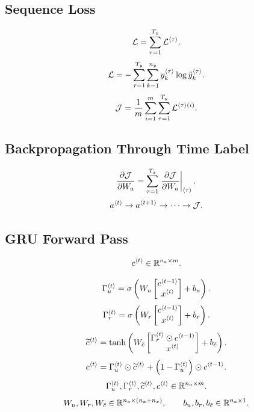\subsection{Sequence Loss}

\[
\mathcal{L}
=
\sum_{\tau=1}^{T_y}
\mathcal{L}^{\langle \tau\rangle}.
\]
\[
\mathcal{L}
=
-\sum_{\tau=1}^{T_y}
\sum_{k=1}^{n_y}
y_k^{\langle \tau\rangle}
\log
\hat{y}_k^{\langle \tau\rangle}.
\]
\[
\mathcal{J}
=
\frac{1}{m}
\sum_{i=1}^{m}
\sum_{\tau=1}^{T_y}
\mathcal{L}^{\langle \tau\rangle(i)}.
\]

\subsection{Backpropagation Through Time Label}

\[
\frac{\partial \mathcal{J}}{\partial W_a}
=
\sum_{\tau=1}^{T_x}
\left.
\frac{\partial \mathcal{J}}{\partial W_a}
\right|_{\langle \tau\rangle}.
\]
\[
a^{\langle t\rangle}
\to
a^{\langle t+1\rangle}
\to
\cdots
\to
\mathcal{J}.
\]

\subsection{GRU Forward Pass}

\[
c^{\langle t\rangle}
\in
\mathbb{R}^{n_a \times m}.
\]

\[
\Gamma_u^{\langle t\rangle}
=
\sigma
\left(
W_u
\begin{bmatrix}
c^{\langle t-1\rangle}\\
x^{\langle t\rangle}
\end{bmatrix}
+
b_u
\right).
\]
\[
\Gamma_r^{\langle t\rangle}
=
\sigma
\left(
W_r
\begin{bmatrix}
c^{\langle t-1\rangle}\\
x^{\langle t\rangle}
\end{bmatrix}
+
b_r
\right).
\]
\[
\widetilde{c}^{\langle t\rangle}
=
\tanh
\left(
W_{\tilde{c}}
\begin{bmatrix}
\Gamma_r^{\langle t\rangle}
\odot
c^{\langle t-1\rangle}\\
x^{\langle t\rangle}
\end{bmatrix}
+
b_{\tilde{c}}
\right).
\]
\[
c^{\langle t\rangle}
=
\Gamma_u^{\langle t\rangle}
\odot
\widetilde{c}^{\langle t\rangle}
+
\left(
1-\Gamma_u^{\langle t\rangle}
\right)
\odot
c^{\langle t-1\rangle}.
\]
\[
\Gamma_u^{\langle t\rangle},
\Gamma_r^{\langle t\rangle},
\widetilde{c}^{\langle t\rangle},
c^{\langle t\rangle}
\in
\mathbb{R}^{n_a \times m}.
\]
\[
W_u,W_r,W_{\tilde{c}}
\in
\mathbb{R}^{n_a \times (n_a+n_x)},
\qquad
b_u,b_r,b_{\tilde{c}}
\in
\mathbb{R}^{n_a \times 1}.
\]

